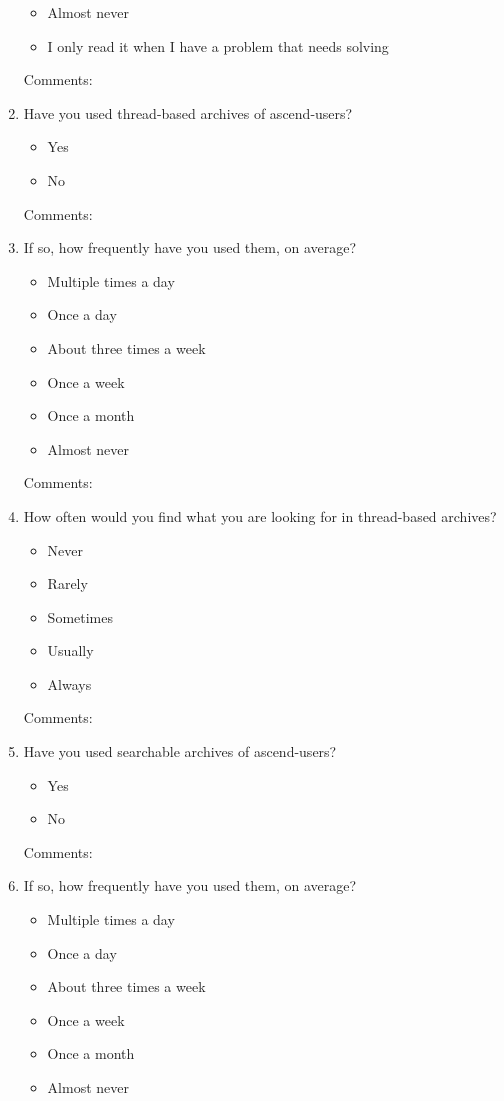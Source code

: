 \begin{enumerate}
\begin{itemize}
  \item Almost never
  \item I only read it when I have a problem that needs solving
  \end{itemize}
  Comments:
\item Have you used thread-based archives of ascend-users?
  \begin{itemize}
  \item Yes
  \item No
  \end{itemize}  
  Comments:
\item If so, how frequently have you used them, on average?
  \begin{itemize}
  \item Multiple times a day
  \item Once a day
  \item About three times a week
  \item Once a week
  \item Once a month
  \item Almost never
  \end{itemize}
  Comments:
\item How often would you find what you are looking for in thread-based
  archives?
  \begin{itemize}
  \item Never
  \item Rarely
  \item Sometimes
  \item Usually
  \item Always
  \end{itemize}
  Comments:
\item Have you used searchable archives of ascend-users?
  \begin{itemize}
  \item Yes
  \item No
  \end{itemize}
  Comments:
\item If so, how frequently have you used them, on average?
  \begin{itemize}
  \item Multiple times a day
  \item Once a day
  \item About three times a week
  \item Once a week
  \item Once a month
  \item Almost never
  \end{itemize}

\end{enumerate}
